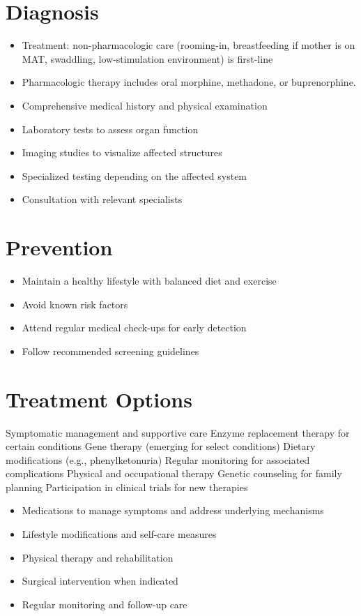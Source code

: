 \section{Diagnosis}
\begin{itemize}[noitemsep]
  \item Treatment: non-pharmacologic care (rooming-in, breastfeeding if mother is on MAT, swaddling, low-stimulation environment) is first-line
  \item Pharmacologic therapy includes oral morphine, methadone, or buprenorphine.
  \item Comprehensive medical history and physical examination
  \item Laboratory tests to assess organ function
  \item Imaging studies to visualize affected structures
  \item Specialized testing depending on the affected system
  \item Consultation with relevant specialists
\end{itemize}
\section{Prevention}
\begin{itemize}[noitemsep]
  \item Maintain a healthy lifestyle with balanced diet and exercise
  \item Avoid known risk factors
  \item Attend regular medical check-ups for early detection
  \item Follow recommended screening guidelines
\end{itemize}
\section{Treatment Options}
Symptomatic management and supportive care Enzyme replacement therapy for certain conditions Gene therapy (emerging for select conditions) Dietary modifications (e.g., phenylketonuria) Regular monitoring for associated complications Physical and occupational therapy Genetic counseling for family planning Participation in clinical trials for new therapies

\begin{itemize}[noitemsep]
  \item Medications to manage symptoms and address underlying mechanisms
  \item Lifestyle modifications and self-care measures
  \item Physical therapy and rehabilitation
  \item Surgical intervention when indicated
  \item Regular monitoring and follow-up care
\end{itemize}
